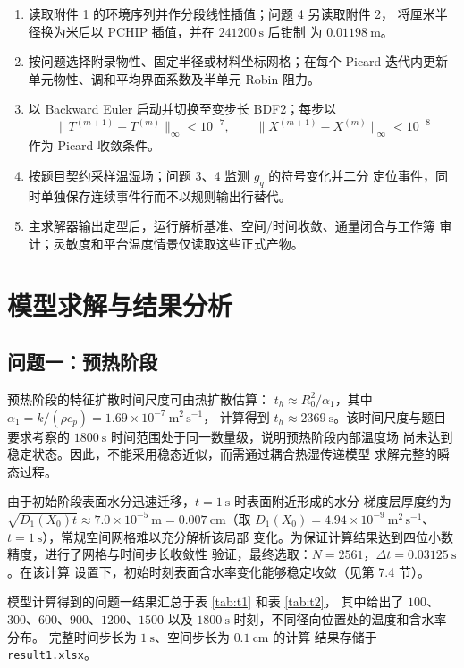 \documentclass[withoutpreface,bwprint]{cumcmthesis}
\begin{document}
\begin{enumerate}[label=\textbf{Step \arabic*:}, leftmargin=2.6cm]
  \item 读取附件 1 的环境序列并作分段线性插值；问题 4 另读取附件 2，
  将厘米半径换为米后以 PCHIP 插值，并在 $241200\ \mathrm{s}$ 后钳制
  为 $0.01198\ \mathrm{m}$。
  \item 按问题选择附录物性、固定半径或材料坐标网格；在每个 Picard
  迭代内更新单元物性、调和平均界面系数及半单元 Robin 阻力。
  \item 以 Backward Euler 启动并切换至变步长 BDF2；每步以
  \[
    \|T^{(m+1)}-T^{(m)}\|_\infty<10^{-7},\qquad
    \|X^{(m+1)}-X^{(m)}\|_\infty<10^{-8}
  \]
  作为 Picard 收敛条件。
  \item 按题目契约采样温湿场；问题 3、4 监测 $g_q$ 的符号变化并二分
  定位事件，同时单独保存连续事件行而不以规则输出行替代。
  \item 主求解器输出定型后，运行解析基准、空间/时间收敛、通量闭合与工作簿
  审计；灵敏度和平台温度情景仅读取这些正式产物。
\end{enumerate}

\section{模型求解与结果分析}

\subsection{问题一：预热阶段}

预热阶段的特征扩散时间尺度可由热扩散估算：
$t_h\approx R_0^2/\alpha_1$，其中
$\alpha_1=k/(\rho c_p)=1.69\times10^{-7}\ \mathrm{m^2\,s^{-1}}$，
计算得到 $t_h\approx2369\ \mathrm{s}$。该时间尺度与题目要求考察的
$1800\ \mathrm{s}$ 时间范围处于同一数量级，说明预热阶段内部温度场
尚未达到稳定状态。因此，不能采用稳态近似，而需通过耦合热湿传递模型
求解完整的瞬态过程。

由于初始阶段表面水分迅速迁移，$t=1\ \mathrm{s}$ 时表面附近形成的水分
梯度层厚度约为 $\sqrt{D_1(X_0)t}\approx7.0\times10^{-5}\ \mathrm{m}=0.007\ \mathrm{cm}$（取 $D_1(X_0)=4.94\times10^{-9}\ \mathrm{m^2\,s^{-1}}$、$t=1\ \mathrm{s}$），常规空间网格难以充分解析该局部
变化。为保证计算结果达到四位小数精度，进行了网格与时间步长收敛性
验证，最终选取：$N=2561$，$\Delta t=0.03125\ \mathrm{s}$。在该计算
设置下，初始时刻表面含水率变化能够稳定收敛（见第 7.4 节）。

模型计算得到的问题一结果汇总于表 \ref{tab:t1} 和表 \ref{tab:t2}，
其中给出了 $100$、$300$、$600$、$900$、$1200$、$1500$ 以及
$1800\ \mathrm{s}$ 时刻，不同径向位置处的温度和含水率分布。
完整时间步长为 $1\ \mathrm{s}$、空间步长为 $0.1\ \mathrm{cm}$ 的计算
结果存储于 \texttt{result1.xlsx}。
\end{document}
